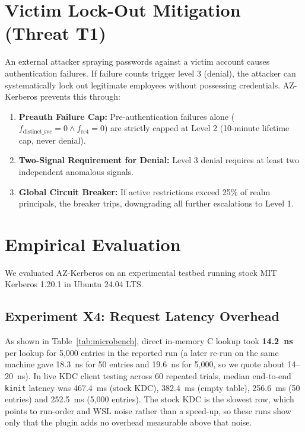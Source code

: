 \documentclass[conference]{IEEEtran}
\begin{document}
\section{Victim Lock-Out Mitigation (Threat T1)}
An external attacker spraying passwords against a victim account causes authentication failures. If failure counts trigger level 3 (denial), the attacker can systematically lock out legitimate employees without possessing credentials. AZ-Kerberos prevents this through:
\begin{enumerate}
    \item \textbf{Preauth Failure Cap:} Pre-authentication failures alone ($f_{\text{distinct\_svc}} = 0 \land f_{\text{rc4}} = 0$) are strictly capped at Level 2 (10-minute lifetime cap, never denial).
    \item \textbf{Two-Signal Requirement for Denial:} Level 3 denial requires at least two independent anomalous signals.
    \item \textbf{Global Circuit Breaker:} If active restrictions exceed 25\% of realm principals, the breaker trips, downgrading all further escalations to Level 1.
\end{enumerate}

\section{Empirical Evaluation}
We evaluated AZ-Kerberos on an experimental testbed running stock MIT Kerberos 1.20.1 in Ubuntu 24.04 LTS.

\subsection{Experiment X4: Request Latency Overhead}
As shown in Table~\ref{tab:microbench}, direct in-memory C lookup took \textbf{14.2~ns} per lookup for 5,000 entries in the reported run (a later re-run on the same machine gave 18.3~ns for 50 entries and 19.6~ns for 5,000, so we quote about 14--20~ns). In live KDC client testing across 60 repeated trials, median end-to-end \texttt{kinit} latency was 467.4~ms (stock KDC), 382.4~ms (empty table), 256.6~ms (50 entries) and 252.5~ms (5,000 entries). The stock KDC is the slowest row, which points to run-order and WSL noise rather than a speed-up, so these runs show only that the plugin adds no overhead measurable above that noise.
\end{document}

